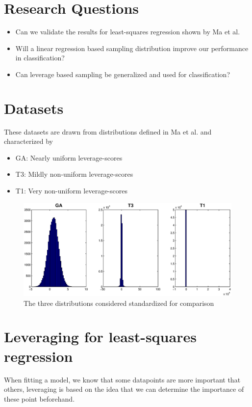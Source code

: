 \documentclass{article}
\begin{document}
%
\section{Research Questions}
\begin{itemize}
	\item Can we validate the results for least-squares regression shown by Ma et al. \cite{Ma}
	\item Will a linear regression based sampling distribution improve our performance in classification?
	\item Can leverage based sampling be generalized and used for classification?
\end{itemize}
%
\section{Datasets}
These datasets are drawn from distributions defined in Ma et al. \cite{Ma} and characterized by

\begin{itemize}
	\item GA: Nearly uniform leverage-scores
	\item T3: Mildly non-uniform leverage-scores
	\item T1: Very non-uniform leverage-scores
\end{itemize}  

\begin{figure}[t]
\centering
\includegraphics[width=\linewidth]{images/Data_distributions}
\caption{The three distributions considered standardized for comparison}
\label{fig:datasets}
\end{figure}
%

\section{Leveraging for least-squares regression}
When fitting a model, we know that some datapoints are more important that others, leveraging is based on the idea that we can determine the importance of these point beforehand.
\end{document}
